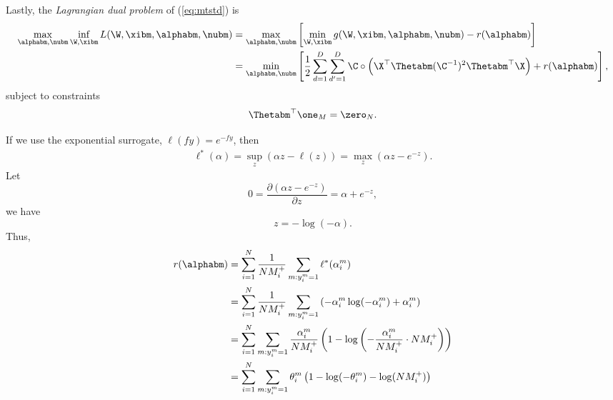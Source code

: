 Lastly, the \emph{Lagrangian dual problem} of (\ref{eq:mtstd}) is
\begin{equation}
\label{eq:mtdual}
\begin{aligned}
\max_{\alphabm, \nubm} \inf_{\W, \xibm} L(\W, \xibm, \alphabm, \nubm) 
&= \max_{\alphabm, \nubm} \left[ \min_{\W, \xibm} g(\W, \xibm, \alphabm, \nubm) - r(\alphabm) \right] \\
&= \min_{\alphabm, \nubm} \left[ \frac{1}{2} \sum_{d=1}^{D} \sum_{d'=1}^{D} \C \circ \left( \X^\top \Thetabm (\C^{-1})^2 \Thetabm^\top \X \right) 
   + r(\alphabm) \right], \\
\end{aligned}
\end{equation}
subject to constraints
\begin{equation*}
\Thetabm^\top \one_M = \zero_{N}.
\end{equation*}

If we use the exponential surrogate, \ie $\ell(fy) = e^{-fy}$, then
\begin{equation*}
\begin{aligned}
\ell^*(\alpha) = \sup_z (\alpha z - \ell(z) ) = \max_z (\alpha z - e^{-z}).
\end{aligned}
\end{equation*}
Let 
\begin{equation*}
0 = \frac{\partial (\alpha z - e^{-z})} {\partial z} = \alpha + e^{-z},
\end{equation*}
we have 
\begin{equation*}
z = -\log(-\alpha).
\end{equation*}
Thus, 
\begin{equation*}
\begin{aligned}
r(\alphabm) 
&= \sum_{i = 1}^{N} \frac{1}{N M_i^+} \sum_{m: y_i^m = 1} \ell^*(\alpha_i^m) \\
&= \sum_{i = 1}^{N} \frac{1}{N M_i^+} \sum_{m: y_i^m = 1} \left( -\alpha_i^m \log(-\alpha_i^m) + \alpha_i^m \right) \\
&= \sum_{i = 1}^{N} \sum_{m: y_i^m = 1} \frac{\alpha_i^m}{N M_i^+} \left(1 - \log \left( -\frac{\alpha_i^m}{N M_i^+} 
   \cdot N M_i^+ \right) \right) \\
&= \sum_{i = 1}^{N} \sum_{m: y_i^m = 1} \theta_i^m \left( 1 - \log(-\theta_i^m) - \log(N M_i^+) \right)
\end{aligned}
\end{equation*}
